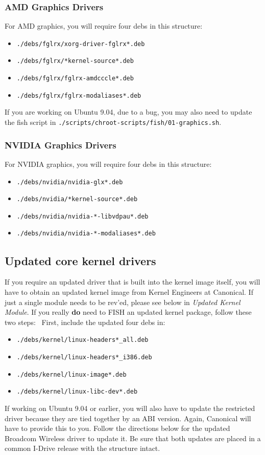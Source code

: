 \documentclass[letterpaper,10pt,titlepage]{article}
\begin{document}
\subsubsection{AMD Graphics Drivers}
For AMD graphics, you will require four debs in this structure:
\begin{itemize}
\item \texttt{./debs/fglrx/xorg-driver-fglrx*.deb}
\item \texttt{./debs/fglrx/*kernel-source*.deb}
\item \texttt{./debs/fglrx/fglrx-amdcccle*.deb}
\item \texttt{./debs/fglrx/fglrx-modaliases*.deb}
\end{itemize}

If you are working on Ubuntu 9.04, due to a bug, you may also need to update the fish script in 
\texttt{./scripts/chroot-scripts/fish/01-graphics.sh}.

\subsubsection{NVIDIA Graphics Drivers}

For NVIDIA graphics, you will require four debs in this structure:
\
\begin{itemize}
\item \texttt{./debs/nvidia/nvidia-glx*.deb}
\item \texttt{./debs/nvidia/*kernel-source*.deb}
\item \texttt{./debs/nvidia/nvidia-*-libvdpau*.deb}
\item \texttt{./debs/nvidia/nvidia-*-modaliases*.deb}
\end{itemize}


\subsection{Updated core kernel drivers}
If you require an updated driver that is built into the kernel image itself, you will have to obtain an updated kernel image from Kernel Engineers at Canonical.  If just a single module needs to be rev'ed, please see below in \textit{Updated Kernel Module}.  If you really \textbf{do} need to FISH an updated kernel package, follow these two steps:
\
First, include the updated four debs in:
\begin{itemize}
\item \texttt{./debs/kernel/linux-headers*_all.deb}
\item \texttt{./debs/kernel/linux-headers*_i386.deb}
\item \texttt{./debs/kernel/linux-image*.deb}
\item \texttt{./debs/kernel/linux-libc-dev*.deb}
\end{itemize}
If working on Ubuntu 9.04 or earlier, you will also have to update the restricted driver because they are tied together by an ABI version.  Again, Canonical will have to provide this to you.  Follow the directions below for the updated Broadcom Wireless driver to update it.  Be sure that both updates are placed in a common I-Drive release with the structure intact.
\end{document}
